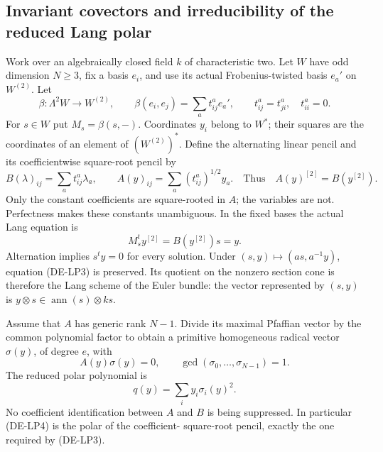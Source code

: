 \subsection{Invariant covectors and irreducibility of the reduced Lang polar}

Work over an algebraically closed field \(k\) of characteristic two.
Let \(W\) have odd dimension \(N\geq3\), fix a basis \(e_i\),
and use its actual Frobenius-twisted basis \(e_a'\) on \(W^{(2)}\).
Let
\[
 \beta:\Lambda^2W\longrightarrow W^{(2)},\qquad
 \beta(e_i,e_j)=\sum_a t_{ij}^a e_a',\qquad
 t_{ij}^a=t_{ji}^a,\quad t_{ii}^a=0.
 \tag{DE-LP1}
\]
For \(s\in W\) put \(M_s=\beta(s,-)\). Coordinates \(y_i\)
belong to \(W^*\); their squares are the coordinates of an element
of \((W^{(2)})^*\). Define the alternating linear pencil and its
coefficientwise square-root pencil by
\[
 B(\lambda)_{ij}=\sum_a t_{ij}^a\lambda_a,\qquad
 A(y)_{ij}=\sum_a (t_{ij}^a)^{1/2}y_a.
 \quad\text{Thus}\quad A(y)^{[2]}=B(y^{[2]}).
 \tag{DE-LP2}
\]
Only the constant coefficients are square-rooted in \(A\); the
variables are not. Perfectness makes these constants unambiguous.
In the fixed bases the actual Lang equation is
\[
       M_s^t y^{[2]}=B(y^{[2]})s=y.
 \tag{DE-LP3}
\]
Alternation implies \(s^ty=0\) for every solution. Under
\((s,y)\mapsto(a s,a^{-1}y)\), equation (DE-LP3) is preserved.
Its quotient on the nonzero section cone is therefore the Lang
scheme of the Euler bundle: the vector represented by \((s,y)\)
is \(y\otimes s\in\operatorname{ann}(s)\otimes ks\).

Assume that \(A\) has generic rank \(N-1\). Divide its maximal
Pfaffian vector by the common polynomial factor to obtain a primitive
homogeneous radical vector \(\sigma(y)\), of degree \(e\), with
\[
 A(y)\sigma(y)=0,\qquad \gcd(\sigma_0,\ldots,\sigma_{N-1})=1.
\]
The reduced polar polynomial is
\[
                    q(y)=\sum_i y_i\sigma_i(y)^2.
 \tag{DE-LP4}
\]
No coefficient identification between \(A\) and \(B\) is being
suppressed. In particular (DE-LP4) is the polar of the coefficient-
square-root pencil, exactly the one required by (DE-LP3).

